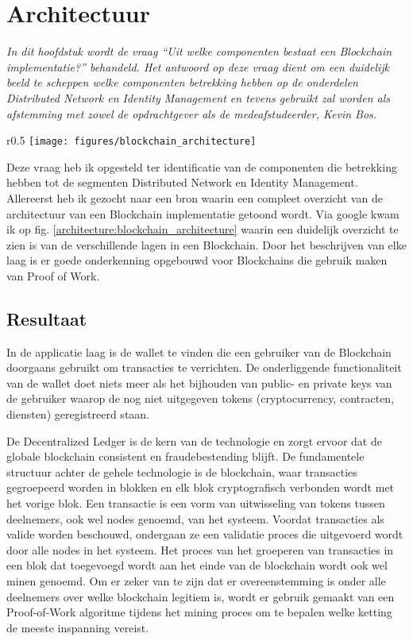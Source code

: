 \section{Architectuur}
\label{chapter:architecture}

\textit{
  In dit hoofdstuk wordt de vraag ``Uit welke componenten bestaat een Blockchain implementatie?'' behandeld. Het antwoord op deze vraag dient om een duidelijk beeld te scheppen welke componenten betrekking hebben op de onderdelen Distributed Network en Identity Management en tevens gebruikt zal worden als afstemming met zowel de opdrachtgever als de medeafstudeerder, Kevin Bos. 
}

\begin{wrapfigure}{r}{0.5\textwidth}
  \texttt{[image: figures/blockchain\_architecture]}
  \caption{Blockchain architectuur}
  \label{architecture:blockchain_architecture}
\end{wrapfigure}

Deze vraag heb ik opgesteld ter identificatie van de componenten die betrekking hebben tot de segmenten Distributed Network en Identity Management. Allereerst heb ik gezocht naar een bron waarin een compleet overzicht van de architectuur van een Blockchain implementatie getoond wordt. Via google kwam ik op fig. \ref{architecture:blockchain_architecture} waarin een duidelijk overzicht te zien is van de verschillende lagen in een Blockchain. Door het beschrijven van elke laag is er goede onderkenning opgebouwd voor Blockchains die gebruik maken van Proof of Work.

\subsection{Resultaat}

In de applicatie laag is de wallet te vinden die een gebruiker van de Blockchain doorgaans gebruikt om transacties te verrichten. De onderliggende functionaliteit van de wallet doet niets meer als het bijhouden van public- en private keys van de gebruiker waarop de nog niet uitgegeven tokens (cryptocurrency, contracten, diensten) geregistreerd staan.

De Decentralized Ledger is de kern van de technologie en zorgt ervoor dat de globale blockchain consistent en fraudebestending blijft. De fundamentele structuur achter de gehele technologie is de blockchain, waar transacties gegroepeerd worden in blokken en elk blok cryptografisch verbonden wordt met het vorige blok. Een transactie is een vorm van uitwisseling van tokens tussen deelnemers, ook wel nodes genoemd, van het systeem. Voordat transacties als valide worden beschouwd, ondergaan ze een validatie proces die uitgevoerd wordt door alle nodes in het systeem. Het proces van het groeperen van transacties in een blok dat toegevoegd wordt aan het einde van de blockchain wordt ook wel minen genoemd. Om er zeker van te zijn dat er overeenstemming is onder alle deelnemers over welke blockchain legitiem is, wordt er gebruik gemaakt van een Proof-of-Work algoritme tijdens het mining proces om te bepalen welke ketting de meeste inspanning vereist.

